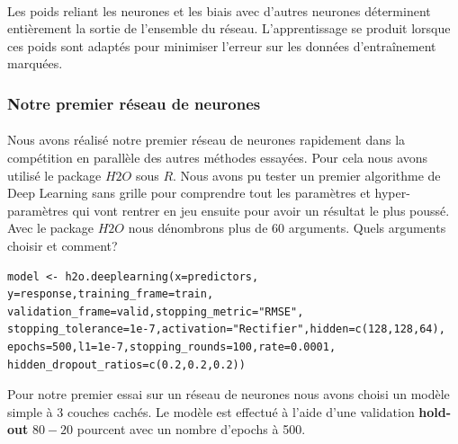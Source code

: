 \documentclass[14pt, openany]{article}
\begin{document}
\paragraph{}
Les poids reliant les neurones et les biais avec d'autres neurones déterminent entièrement la sortie de l'ensemble du réseau. L'apprentissage se produit lorsque ces poids sont adaptés pour minimiser l'erreur sur les données d'entraînement marquées.

\subsubsection{Notre premier réseau de neurones}

\paragraph{}
Nous avons réalisé notre premier réseau de neurones rapidement dans la compétition en parallèle des autres méthodes essayées. Pour cela nous avons utilisé le package $H2O$ sous $R$. Nous avons pu tester un premier algorithme de Deep Learning sans grille pour comprendre tout les paramètres et hyper-paramètres qui vont rentrer en jeu ensuite pour avoir un résultat le plus poussé. Avec le package $H2O$ nous dénombrons plus de $60$ arguments. Quels arguments choisir et comment?

\begin{verbatim}
model <- h2o.deeplearning(x=predictors, y=response,training_frame=train,
validation_frame=valid,stopping_metric="RMSE",
stopping_tolerance=1e-7,activation="Rectifier",hidden=c(128,128,64), 
epochs=500,l1=1e-7,stopping_rounds=100,rate=0.0001,
hidden_dropout_ratios=c(0.2,0.2,0.2))
\end{verbatim}

Pour notre premier essai sur un réseau de neurones nous avons choisi un modèle simple à 3 couches cachés. Le modèle est effectué à l'aide d'une validation \textbf{hold-out}  $80-20$ pourcent avec un nombre d'epochs à 500.
\end{document}
